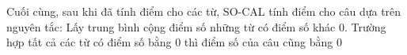 
Cuối cùng, sau khi đã tính điểm cho các từ, SO-CAL tính điểm cho câu dựa trên nguyên tắc: Lấy trung bình cộng điểm số những từ có điểm số khác 0. Trường hợp tất cả các từ có điểm số bằng 0 thì điểm số của câu cũng bằng 0
